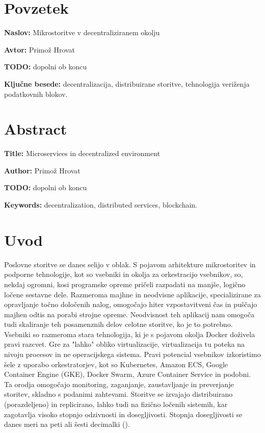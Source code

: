 \documentclass[a4paper, 12pt]{book}
\newcommand{\ttitle}{Mikrostoritve v decentraliziranem okolju}
\newcommand{\ttitleEn}{Microservices in decentralized environment}
\newcommand{\tauthor}{Primož Hrovat}
\newcommand{\tkeywords}{decentralizacija, distribuirane storitve, tehnologija veriženja podatkovnih blokov}
\newcommand{\tkeywordsEn}{decentralization, distributed services, blockchain}
\newcommand{\clearemptydoublepage}{\newpage{\pagestyle{empty}\cleardoublepage}}
\begin{document}
\clearemptydoublepage

\chapter*{Povzetek}

\noindent\textbf{Naslov:} \ttitle
\bigskip

\noindent\textbf{Avtor:} \tauthor
\bigskip

\noindent

\textbf{TODO:} dopolni ob koncu

\bigskip

\noindent\textbf{Ključne besede:} \tkeywords.
\clearemptydoublepage

\chapter*{Abstract}

\noindent\textbf{Title:} \ttitleEn
\bigskip

\noindent\textbf{Author:} \tauthor
\bigskip

\noindent 
\textbf{TODO:} dopolni ob koncu

\bigskip

\noindent\textbf{Keywords:} \tkeywordsEn.
\clearemptydoublepage

\mainmatter
\setcounter{page}{1}
\pagestyle{fancy}

\chapter{Uvod}
Poslovne storitve se danes selijo v oblak.
S pojavom arhitekture mikrostoritev in podporne tehnologije, kot so vsebniki in okolja za orkestracijo vsebnikov, so, nekdaj ogromni, kosi programske opreme pričeli razpadati na manjše, logično ločene sestavne dele.
Razmeroma majhne in neodvisne aplikacije, specializirane za opravljanje točno določenih nalog, omogočajo hiter vzpostavitveni čas in puščajo majhen odtis na porabi strojne opreme.
Neodvisnost teh aplikacij nam omogoča tudi skaliranje teh posamenznih delov celotne storitve, ko je to potrebno.
Vsebniki so razmeroma stara tehnologija, ki je s pojavom okolja Docker doživela pravi razcvet.
Gre za "lahko" obliko virtualizacije, virtualizacija tu poteka na nivoju procesov in ne operacijskega sistema.
Pravi potencial vsebnikov izkoristimo šele z uporabo orkestratorjev, kot so Kubernetes, Amazon ECS, Google Container Engine (GKE), Docker Swarm, Azure Container Service in podobni.
Ta orodja omogočajo monitoring, zaganjanje, zaustavljanje in preverjanje storitev, skladno s podanimi zahtevami.
Storitve se izvajajo distribuirano (porazdeljeno) in replicirano, lahko tudi na fizično ločenih sistemih, kar zagotavlja visoko stopnjo odzivnosti in dosegljivosti. Stopnja dosegljivosti se danes meri na peti ali šesti decimalki ().
\end{document}
